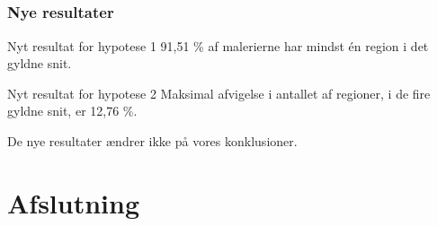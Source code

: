 \documentclass[xcolor=table]{beamer}
\begin{document}
\begin{frame}


\end{frame}

\subsection*{}
\begin{frame}

    \frametitle{Nye resultater}

    \begin{block}{Nyt resultat for hypotese 1\hspace{12em}}
        91,51 \% af malerierne har mindst én region i det gyldne snit.\\
    \end{block}

    \begin{block}{Nyt resultat for hypotese 2\hspace{14em}}
        Maksimal afvigelse i antallet af regioner, i de fire gyldne snit, er 12,76 \%.
    \end{block}

    De nye resultater ændrer ikke på vores konklusioner.

\end{frame}

\section{Afslutning}
\end{document}

